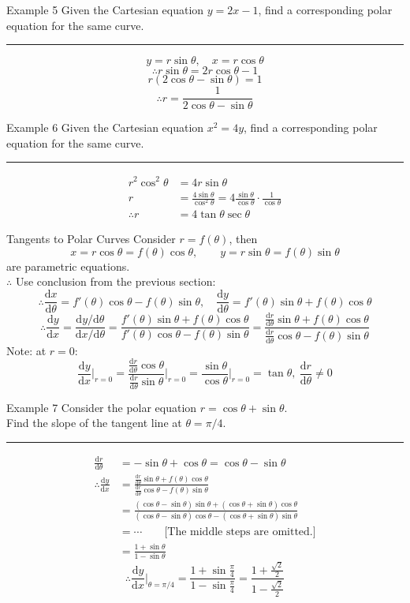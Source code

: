 \documentclass[12pt,a4paper]{article}
\def\d{{\mathrm{d}}}
\def\dydx{\frac{\d y}{\d x}}
\def\dx{\d x}
\begin{document}
\begin{eg}{Example 5}
	Given the Cartesian equation $y=2x-1$, find a corresponding polar equation for the same curve. \\
	\noindent\rule[0.25\baselineskip]{\textwidth}{1pt}
	\[y=r\sin\theta,\quad x=r\cos\theta\]
	\[\therefore r\sin\theta=2r\cos\theta-1\]
	\[r(2\cos\theta-\sin\theta)=1\]
	\[\therefore r=\frac{1}{2\cos\theta-\sin\theta}\]	
\end{eg}
\begin{eg}{Example 6}
	Given the Cartesian equation $x^2=4y$, find a corresponding polar equation for the same curve. \\
	\noindent\rule[0.25\baselineskip]{\textwidth}{1pt}
	\[\begin{aligned}
		r^2\cos^2\theta&=4r\sin\theta\\
		r&=\frac{4\sin\theta}{\cos^2\theta}=4\frac{\sin\theta}{\cos\theta}\cdot\frac{1}{\cos\theta}\\
		\therefore r&=4\tan\theta\sec\theta
	\end{aligned}\]	
\end{eg}
\begin{thm}{Tangents to Polar Curves}
	Consider $r=f(\theta)$, then \[x=r\cos\theta=f(\theta)\cos\theta,\qquad y=r\sin\theta=f(\theta)\sin{\theta}\] are parametric equations. \\
	$\therefore$ Use conclusion from the previous section: 
	\[\therefore \frac{\dx}{\d\theta}=f'(\theta)\cos\theta-f(\theta)\sin\theta,\quad\frac{\d y}{\d\theta}=f'(\theta)\sin\theta+f(\theta)\cos\theta\]
	\[\therefore\dydx=\frac{\d y/\d\theta}{\dx/\d\theta}=\frac{f'(\theta)\sin\theta+f(\theta)\cos\theta}{f'(\theta)\cos\theta-f(\theta)\sin\theta}=\frac{\frac{\d r}{\d\theta}\sin\theta+f(\theta)\cos\theta}{\frac{\d r}{\d\theta}\cos\theta-f(\theta)\sin\theta}\]
	Note: at $r=0$:
	\[\dydx\bigg|_{r=0}=\frac{\frac{\d r}{\d\theta}\cos\theta}{\frac{\d r}{\d\theta}\sin\theta}\bigg|_{r=0}=\frac{\sin\theta}{\cos\theta}\bigg|_{r=0}=\tan\theta,\ \frac{\d r}{\d\theta}\neq0\]
\end{thm}
\begin{eg}{Example 7}
	Consider the polar equation $r=\cos\theta+\sin\theta$. \\
	Find the slope of the tangent line at $\theta=\pi/4$. \\
	\noindent\rule[0.25\baselineskip]{\textwidth}{1pt}
	\[\begin{aligned}
		\frac{\d r}{\d\theta}&=-\sin\theta+\cos\theta=\cos\theta-\sin\theta\\
		\therefore\dydx&=\frac{\frac{\d r}{\d\theta}\sin\theta+f(\theta)\cos\theta}{\frac{\d r}{\d\theta}\cos\theta-f(\theta)\sin\theta}\\
		&=\frac{(\cos\theta-\sin\theta)\sin\theta+(\cos\theta+\sin\theta)\cos\theta}{(\cos\theta-\sin\theta)\cos\theta-(\cos\theta+\sin\theta)\sin\theta}\\
		&=\cdots\qquad\text{[The middle steps are omitted.]}\\
		&=\frac{1+\sin\theta}{1-\sin\theta}
	\end{aligned}\]
	\[\therefore\dydx\bigg|_{\theta=\pi/4}=\frac{1+\sin\frac{\pi}{4}}{1-\sin\frac{\pi}{4}}=\frac{1+\frac{\sqrt{2}}{2}}{1-\frac{\sqrt{2}}{2}}\]
\end{eg}
\end{document}
